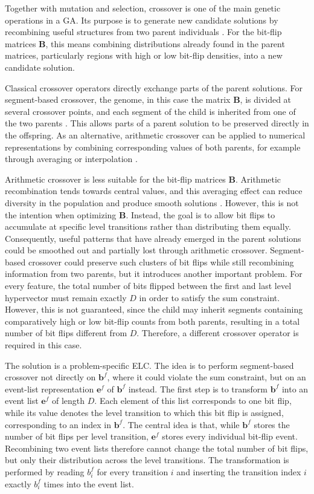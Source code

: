     Together with mutation and selection, crossover is one of the main genetic operations in a \ac{GA}. Its purpose is to generate new candidate solutions by recombining useful structures from two parent individuals \cite{sudholt_crossover_2012}. For the bit-flip matrices $\mathbf{B}$, this means combining distributions already found in the parent matrices, particularly regions with high or low bit-flip densities, into a new candidate solution.
    
    Classical crossover operators directly exchange parts of the parent solutions. For segment-based crossover, the genome, in this case the matrix $\mathbf{B}$, is divided at several crossover points, and each segment of the child is inherited from one of the two parents \cite{spears_virtues_1995}. This allows parts of a parent solution to be preserved directly in the offspring. As an alternative, arithmetic crossover can be applied to numerical representations by combining corresponding values of both parents, for example through averaging or interpolation \cite{herrera_taxonomy_2003}.

    Arithmetic crossover is less suitable for the bit-flip matrices $\mathbf{B}$. Arithmetic recombination tends towards central values, and this averaging effect can reduce diversity in the population and produce smooth solutions \cite{herrera_taxonomy_2003}. However, this is not the intention when optimizing $\mathbf{B}$. Instead, the goal is to allow bit flips to accumulate at specific level transitions rather than distributing them equally. Consequently, useful patterns that have already emerged in the parent solutions could be smoothed out and partially lost through arithmetic crossover. Segment-based crossover could preserve such clusters of bit flips while still recombining information from two parents, but it introduces another important problem. For every feature, the total number of bits flipped between the first and last level hypervector must remain exactly $D$ in order to satisfy the sum constraint. However, this is not guaranteed, since the child may inherit segments containing comparatively high or low bit-flip counts from both parents, resulting in a total number of bit flips different from $D$. Therefore, a different crossover operator is required in this case.

    
    The solution is a problem-specific \ac{ELC}. The idea is to perform segment-based crossover not directly on $\mathbf{b}^f$, where it could violate the sum constraint, but on an event-list representation $\mathbf{e}^f$ of $\mathbf{b}^f$ instead. The first step is to transform $\mathbf{b}^f$ into an event list $\mathbf{e}^f$ of length $D$. Each element of this list corresponds to one bit flip, while its value denotes the level transition to which this bit flip is assigned, corresponding to an index in $\mathbf{b}^f$. The central idea is that, while $\mathbf{b}^f$ stores the number of bit flips per level transition, $\mathbf{e}^f$ stores every individual bit-flip event. Recombining two event lists therefore cannot change the total number of bit flips, but only their distribution across the level transitions. The transformation is performed by reading $b^f_i$ for every transition $i$ and inserting the transition index $i$ exactly $b^f_i$ times into the event list. 

